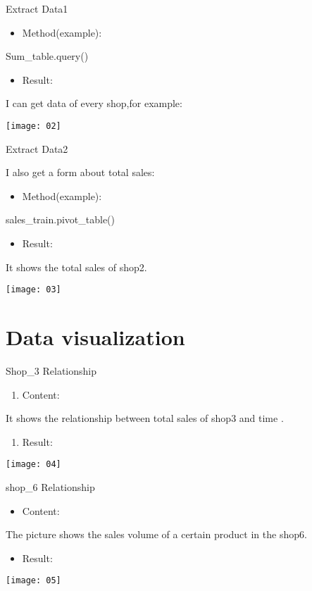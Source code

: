 \documentclass[
 size=12pt,
 paper=smartboard, %
 mode=present, %
 display=slides, %
style=tuliplab,
pauseslide,
fleqn,leqno]{powerdot}
\begin{document}
\begin{slide}{Extract Data1}
\begin{itemize}
\item Method(example):
\end{itemize}
\center Sum_table.query()
\begin{itemize}
\item Result:
\end{itemize}
I can get data of every shop,for example: \par
\texttt{[image: 02]}
\end{slide}

\begin{slide}{Extract Data2}

I also get a form about total sales:

\begin{itemize}
\item Method(example):
\end{itemize}

\center  sales_train.pivot_table()\par

\begin{itemize}
\item Result:
\end{itemize}

It shows the total sales of shop2. \par

\texttt{[image: 03]}

\end{slide}


\section{Data visualization}
\begin{slide}{Shop_3 Relationship }
\begin{enumerate}[type=1]%
\item Content:
\end{enumerate}
\center
It shows the relationship between total sales of shop3 and time .
\begin{enumerate}[type=1]%
\item Result:
\end{enumerate}
\texttt{[image: 04]}
\end{slide}


\begin{slide}{shop_6 Relationship}
\begin{itemize}
\item Content:
\end{itemize}
\center The picture shows the sales volume  of a certain product in the shop6.
\begin{itemize}
\item Result:
\end{itemize}
\texttt{[image: 05]}
\end{slide}
\end{document}
